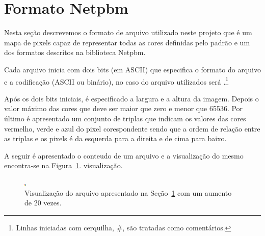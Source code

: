%
%
%

\section{Formato Netpbm} \label{sse:Netpbm}
Nesta seção descrevemos o formato de arquivo  utilizado neste projeto
que é um mapa de pixels capaz de representar todas as cores definidas pelo
padrão  e um dos formatos descritos na biblioteca
Netpbm.\nocite{wiki:Netpbm_format, Henderson:Netpbm}

Cada arquivo inicia com dois bits (em ASCII) que especifica o formato do arquivo
e a codificação (ASCII ou binário), no caso do arquivo  utilizados
será .\footnote{Linhas iniciadas com cerquilha, \#, são tratadas
como comentários.}

Após os dois bits iniciais, é especificado a largura e a altura da imagem.
Depois o valor máximo das cores que deve ser maior que zero e menor que 65536.
Por último é apresentado um conjunto de triplas que indicam os valores das cores
vermelho, verde e azul do pixel corespondente sendo que a ordem de relação entre
as triplas e os pixels é da esquerda para a direita e de cima para baixo.

A seguir é apresentado o conteudo de um arquivo  e a visualização do
mesmo encontra-se na Figura~\ref{fig:minimal.ppm}.
visualização.

\begin{figure}[!htb]
    \begin{center}
        \includegraphics[scale=20]{../src/test/minimal.png}
    \end{center}
    \caption{Visualização do arquivo  apresentado na
    Seção~\ref{sse:Netpbm} com um aumento de 20 vezes.}
    \label{fig:minimal.ppm}
\end{figure}

